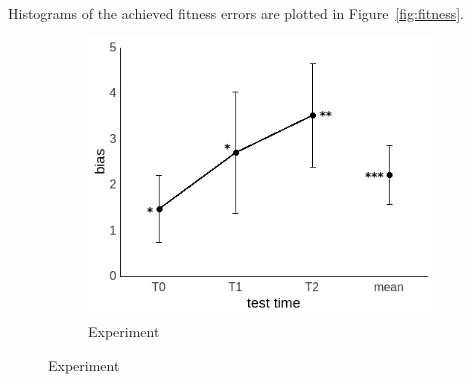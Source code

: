 \documentclass[a4paper]{scrreprt}
\begin{document}
Histograms of the achieved fitness errors are plotted in Figure~\ref{fig:fitness}.

\begin{figure}
\centering
    \begin{subfigure}[b]{0.49\textwidth}
\includegraphics[width=\textwidth]{figs/sec3/bias_all_dat.jpeg}
\caption{Experiment}
    \end{subfigure}
    

\end{figure}
\end{document}
